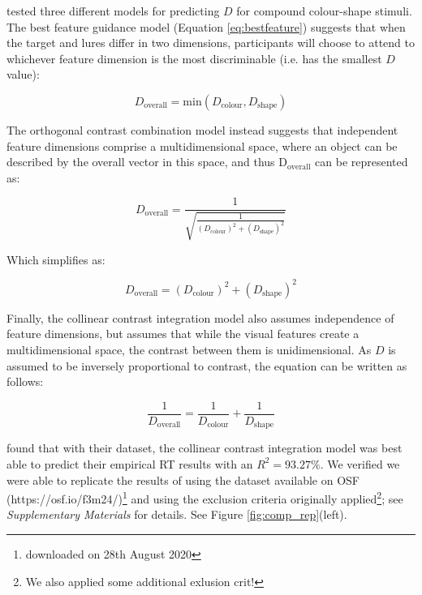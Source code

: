 \documentclass[smallextended]{svjour3}       %
\begin{document}
\cite{buetti2019predicting} tested three different models for predicting $D$ for compound colour-shape stimuli. The best feature guidance model (Equation \ref{eq:bestfeature}) suggests that when the target and lures differ in two dimensions, participants will choose to attend to whichever feature dimension is the most discriminable (i.e. has the smallest $D$ value):

\begin{equation}
D_\text{overall} = \text{min}\left(D_\text{colour}, D_\text{shape}\right)
\label{eq:bestfeature}
\end{equation}

The orthogonal contrast combination model instead suggests that independent feature dimensions comprise a multidimensional space, where an object can be described by the overall vector in this space, and thus $\mathrm{D_{overall}}$ can be represented as:

\begin{equation}
D_\text{overall} = \frac{1}{\sqrt{\frac{1}{(D_\text{colour})^2 + (D_\text{shape})^2}}}
\label{eq:orthogonalcontrast}
\end{equation}

Which simplifies as:

\begin{equation}
D_\text{overall} = (D_\text{colour})^2 + (D_\text{shape})^2
\label{eq:orthogonalcontrast2}
\end{equation}

Finally, the collinear contrast integration model also assumes independence of feature dimensions, but assumes that while the visual features create a multidimensional space, the contrast between them is unidimensional. As $D$ is assumed to be inversely proportional to contrast, the equation can be written as follows:

\begin{equation}
\frac{1}{D_\text{overall}} = \frac{1}{D_\text{colour}} + \frac{1}{D_\text{shape}}
\label{eq:collinearcontrast}
\end{equation}

\cite{buetti2019predicting} found that with their dataset, the collinear contrast integration model was best able to predict their empirical RT results with an $R^2 = 93.27\%$. 
We verified we were able to replicate the results of \cite{buetti2019predicting} using the dataset available on OSF (https://osf.io/f3m24/)\footnote{downloaded on 28th August 2020} and using the exclusion criteria originally applied\footnote{We also applied some additional exlusion crit!}; see \textit{Supplementary Materials} for details. See Figure \ref{fig:comp_rep}(left).
\end{document}
